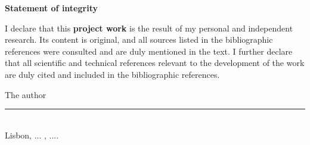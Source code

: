 
\vspace{5em}
\begin{center}
    \textbf{Statement of integrity}
\end{center}

I declare that this \textbf{project work} is the result of my personal and independent research. Its content is original, and all sources listed in the bibliographic references were consulted and are duly mentioned in the text. I further declare that all scientific and technical references relevant to the development of the work are duly cited and included in the bibliographic references.

\begin{center}
The author
\\[2em]

\rule{.5\textwidth}{1pt}
\\[.5em]
\fontsize{10}{12.2}
\selectfont
Lisbon, ...  , ....
\end{center}
